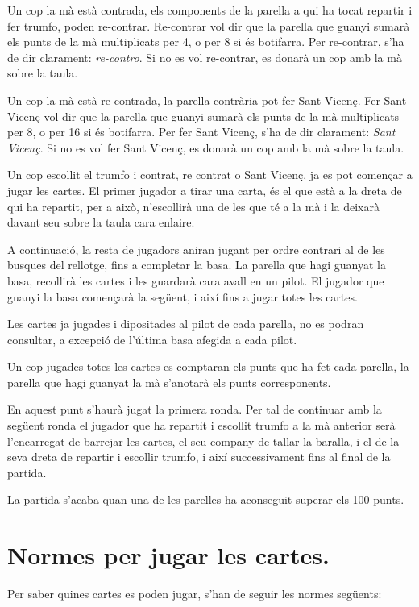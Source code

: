 Un cop la mà està contrada, els components de la parella a qui ha tocat repartir i fer trumfo, poden re-contrar. Re-contrar vol dir que la parella que guanyi sumarà els punts de la mà multiplicats per 4, o per 8 si és botifarra. Per re-contrar, s'ha de dir clarament: \emph{re-contro}. Si no es vol re-contrar, es donarà un cop amb la mà sobre la taula.

Un cop la mà està re-contrada, la parella contrària pot fer Sant Vicenç. Fer Sant Vicenç  vol dir que la parella que guanyi sumarà els punts de la mà multiplicats per 8, o per 16 si és botifarra. Per fer Sant Vicenç, s'ha de dir clarament: \emph{Sant Vicenç}. Si no es vol fer Sant Vicenç, es donarà un cop amb la mà sobre la taula.


Un cop escollit el trumfo i contrat, re contrat o Sant Vicenç, ja es pot començar a jugar les cartes. El primer jugador a tirar una carta, és el que està a la dreta de qui ha repartit, per a això, n'escollirà una de les que té a la mà i la deixarà davant seu sobre la taula cara enlaire.

A continuació, la resta de jugadors aniran jugant per ordre contrari al de les busques del rellotge, fins a completar la basa. La parella que hagi guanyat la basa, recollirà les cartes i les guardarà cara avall en un pilot. El jugador que guanyi la basa començarà la següent, i així fins a jugar totes les cartes.

Les cartes ja jugades i dipositades al pilot de cada parella, no es podran consultar, a excepció de l'última basa afegida a cada pilot.

Un cop jugades totes les cartes es comptaran els punts que ha fet cada parella, la parella que hagi guanyat la mà s'anotarà els punts corresponents.

En aquest punt s'haurà jugat la primera ronda. Per tal de continuar amb la següent ronda el jugador que ha repartit i escollit trumfo a la mà anterior serà l'encarregat de barrejar les cartes, el seu company de tallar la baralla, i el de la seva dreta de repartir i escollir trumfo, i així successivament fins al final de la partida.

La partida s'acaba quan una de les parelles ha aconseguit superar els 100 punts.

\section{Normes per jugar les cartes.}

Per saber quines cartes es poden jugar, s'han de seguir les normes següents:

